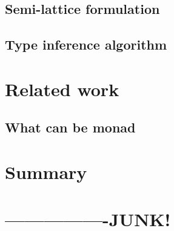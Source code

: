 \subsection{Semi-lattice formulation}
\subsection{Type inference algorithm}


\section{Related work}

\subsection{What can be monad}
\label{sec:flat-related-monads}


\section{Summary}

\section{----------------JUNK!}





~
\newpage
~


\newcommand{\iftor}[1]{C^{#1}}
\newcommand{\iftorhat}[1]{\hat{C}^{#1}}

\newcommand{\cosem}[1]{\llbracket #1 \rrbracket}
\newcommand{\interp}[1]{\llbracket #1 \rrbracket}
\newcommand{\ccat}[0]{\mathcal{C}}
\newcommand{\obj}[1]{\textnormal{obj}(#1)}

\newcommand{\cobind}[2]{#1^\dagger_{#2}}
\newcommand{\cmerge}[0]{ \ident{m} }
\newcommand{\csplit}[0]{ \ident{n} }
\newcommand{\counit}[0]{ \varepsilon }


